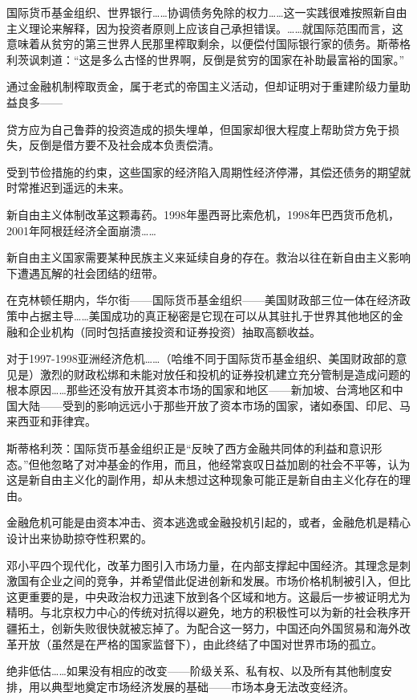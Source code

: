 国际货币基金组织、世界银行……协调债务免除的权力……这一实践很难按照新自由主义理论来解释，因为投资者原则上应该自己承担错误。……就国际范围而言，这意味着从贫穷的第三世界人民那里榨取剩余，以便偿付国际银行家的债务。斯蒂格利茨讽刺道：“这是多么古怪的世界啊，反倒是贫穷的国家在补助最富裕的国家。”


通过金融机制榨取贡金，属于老式的帝国主义活动，但却证明对于重建阶级力量助益良多——

贷方应为自己鲁莽的投资造成的损失埋单，但国家却很大程度上帮助贷方免于损失，反倒是借方要不及社会成本负责偿清。

受到节俭措施的约束，这些国家的经济陷入周期性经济停滞，其偿还债务的期望就时常推迟到遥远的未来。

新自由主义体制改革这颗毒药。1998年墨西哥比索危机，1998年巴西货币危机，2001年阿根廷经济全面崩溃……

新自由主义国家需要某种民族主义来延续自身的存在。救治以往在新自由主义影响下遭遇瓦解的社会团结的纽带。

在克林顿任期内，华尔街——国际货币基金组织——美国财政部三位一体在经济政策中占据主导……美国成功的真正秘密是它现在可以从其驻扎于世界其他地区的金融和企业机构（同时包括直接投资和证券投资）抽取高额收益。

对于1997-1998亚洲经济危机……（哈维不同于国际货币基金组织、美国财政部的意见是）激烈的财政松绑和未能对放任和投机的证券投机建立充分管制是造成问题的根本原因……那些还没有放开其资本市场的国家和地区——新加坡、台湾地区和中国大陆——受到的影响远远小于那些开放了资本市场的国家，诸如泰国、印尼、马来西亚和菲律宾。

斯蒂格利茨：国际货币基金组织正是“反映了西方金融共同体的利益和意识形态。”但他忽略了对冲基金的作用，而且，他经常哀叹日益加剧的社会不平等，认为这是新自由主义化的副作用，却从未想过这种现象可能正是新自由主义化存在的理由。

金融危机可能是由资本冲击、资本逃逸或金融投机引起的，或者，金融危机是精心设计出来协助掠夺性积累的。

 邓小平四个现代化，改革力图引入市场力量，在内部支撑起中国经济。其理念是刺激国有企业之间的竞争，并希望借此促进创新和发展。市场价格机制被引入，但比这更重要的是，中央政治权力迅速下放到各个区域和地方。这最后一步被证明尤为精明。与北京权力中心的传统对抗得以避免，地方的积极性可以为新的社会秩序开疆拓土，创新失败很快就被忘掉了。为配合这一努力，中国还向外国贸易和海外改革开放（虽然是在严格的国家监督下），由此终结了中国对世界市场的孤立。

 绝非低估……如果没有相应的改变——阶级关系、私有权、以及所有其他制度安排，用以典型地奠定市场经济发展的基础——市场本身无法改变经济。

